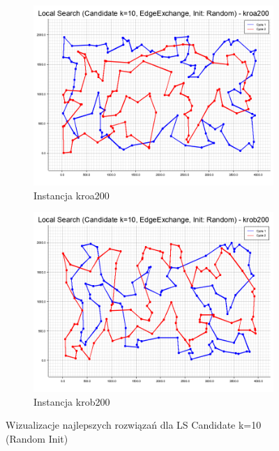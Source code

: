 \documentclass[12pt,a4paper]{article}
\begin{document}
\begin{figure}[H]
\begin{adjustwidth}{-1.5cm}{-1.5cm}
    \centering
    \begin{subfigure}[b]{0.6\textwidth}
        \centering
        \includegraphics[width=\textwidth]{figures/kroa200_Local_Search_Candidate_k_10_EdgeExchange_Init_Random_.png}
        \caption{Instancja kroa200}
        \label{fig:candidate_kroa200}
    \end{subfigure}
    \hfill
    \begin{subfigure}[b]{0.6\textwidth}
        \centering
        \includegraphics[width=\textwidth]{figures/krob200_Local_Search_Candidate_k_10_EdgeExchange_Init_Random_.png}
        \caption{Instancja krob200}
        \label{fig:candidate_krob200}
    \end{subfigure}
    \caption{Wizualizacje najlepszych rozwiązań dla LS Candidate k=10 (Random Init)}
    \label{fig:candidate}
\end{adjustwidth}
\end{figure}
\end{document}
